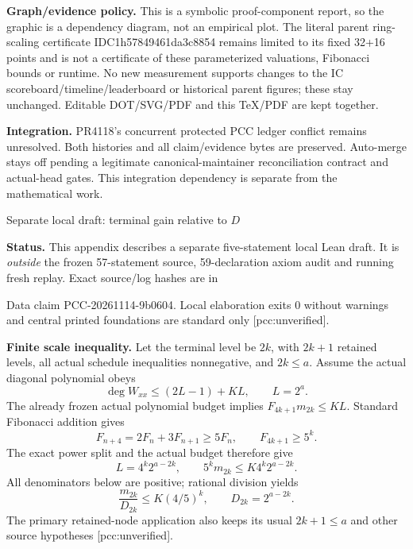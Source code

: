 \documentclass[10pt]{article}
\begin{document}
\textbf{Graph/evidence policy.} This is a symbolic proof-component report,
so the graphic is a dependency diagram, not an empirical plot. The literal
parent ring-scaling certificate IDC1h57849461da3c8854 remains limited to its
fixed 32+16 points and is not a certificate of these parameterized valuations,
Fibonacci bounds or runtime. No new measurement supports changes to the
IC scoreboard/timeline/leaderboard or historical parent figures; these stay
unchanged. Editable DOT/SVG/PDF and this TeX/PDF are kept together.

\textbf{Integration.} PR4118's concurrent protected PCC ledger conflict
remains unresolved. Both histories and all claim/evidence bytes are
preserved. Auto-merge stays off pending a legitimate canonical-maintainer
reconciliation contract and actual-head gates. This integration dependency
is separate from the mathematical work.
\newpage
\begin{center}{\Large Separate local draft: terminal gain relative to $D$}\end{center}
\textbf{Status.} This appendix describes a separate five-statement local
Lean draft. It is \emph{outside} the frozen 57-statement source, 59-declaration
axiom audit and running fresh replay. Exact source/log hashes are in
\begin{center}\small{}\end{center} Data claim
PCC-20261114-9b0604. Local elaboration exits 0 without warnings and central
printed foundations are standard only [pcc:unverified].

\textbf{Finite scale inequality.} Let the terminal level be $2k$, with
$2k+1$ retained levels, all actual schedule inequalities nonnegative, and
$2k\le a$. Assume the actual diagonal polynomial obeys
\[
 \deg W_{xx}\le (2L-1)+KL,\qquad L=2^a.
\]
The already frozen actual polynomial budget implies
$F_{4k+1}m_{2k}\le KL$. Standard Fibonacci addition gives
\[
 F_{n+4}=2F_n+3F_{n+1}\ge5F_n,
 \qquad F_{4k+1}\ge5^k.
\]
The exact power split and the actual budget therefore give
\[
 L=4^k2^{a-2k},\qquad 5^km_{2k}\le K4^k2^{a-2k}.
\]
All denominators below are positive; rational division yields
\[
 \boxed{\frac{m_{2k}}{D_{2k}}\le K(4/5)^k},\qquad D_{2k}=2^{a-2k}.
\]
The primary retained-node application also keeps its usual $2k+1\le a$
and other source hypotheses [pcc:unverified].
\end{document}
